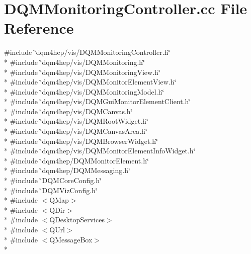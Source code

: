 \section{D\+Q\+M\+Monitoring\+Controller.\+cc File Reference}
\label{DQMMonitoringController_8cc}
{\ttfamily \#include \char`\"{}dqm4hep/vis/\+D\+Q\+M\+Monitoring\+Controller.\+h\char`\"{}}\\*
{\ttfamily \#include \char`\"{}dqm4hep/vis/\+D\+Q\+M\+Monitoring.\+h\char`\"{}}\\*
{\ttfamily \#include \char`\"{}dqm4hep/vis/\+D\+Q\+M\+Monitoring\+View.\+h\char`\"{}}\\*
{\ttfamily \#include \char`\"{}dqm4hep/vis/\+D\+Q\+M\+Monitor\+Element\+View.\+h\char`\"{}}\\*
{\ttfamily \#include \char`\"{}dqm4hep/vis/\+D\+Q\+M\+Monitoring\+Model.\+h\char`\"{}}\\*
{\ttfamily \#include \char`\"{}dqm4hep/vis/\+D\+Q\+M\+Gui\+Monitor\+Element\+Client.\+h\char`\"{}}\\*
{\ttfamily \#include \char`\"{}dqm4hep/vis/\+D\+Q\+M\+Canvas.\+h\char`\"{}}\\*
{\ttfamily \#include \char`\"{}dqm4hep/vis/\+D\+Q\+M\+Root\+Widget.\+h\char`\"{}}\\*
{\ttfamily \#include \char`\"{}dqm4hep/vis/\+D\+Q\+M\+Canvas\+Area.\+h\char`\"{}}\\*
{\ttfamily \#include \char`\"{}dqm4hep/vis/\+D\+Q\+M\+Browser\+Widget.\+h\char`\"{}}\\*
{\ttfamily \#include \char`\"{}dqm4hep/vis/\+D\+Q\+M\+Monitor\+Element\+Info\+Widget.\+h\char`\"{}}\\*
{\ttfamily \#include \char`\"{}dqm4hep/\+D\+Q\+M\+Monitor\+Element.\+h\char`\"{}}\\*
{\ttfamily \#include \char`\"{}dqm4hep/\+D\+Q\+M\+Messaging.\+h\char`\"{}}\\*
{\ttfamily \#include \char`\"{}D\+Q\+M\+Core\+Config.\+h\char`\"{}}\\*
{\ttfamily \#include \char`\"{}D\+Q\+M\+Viz\+Config.\+h\char`\"{}}\\*
{\ttfamily \#include $<$Q\+Map$>$}\\*
{\ttfamily \#include $<$Q\+Dir$>$}\\*
{\ttfamily \#include $<$Q\+Desktop\+Services$>$}\\*
{\ttfamily \#include $<$Q\+Url$>$}\\*
{\ttfamily \#include $<$Q\+Message\+Box$>$}\\*
